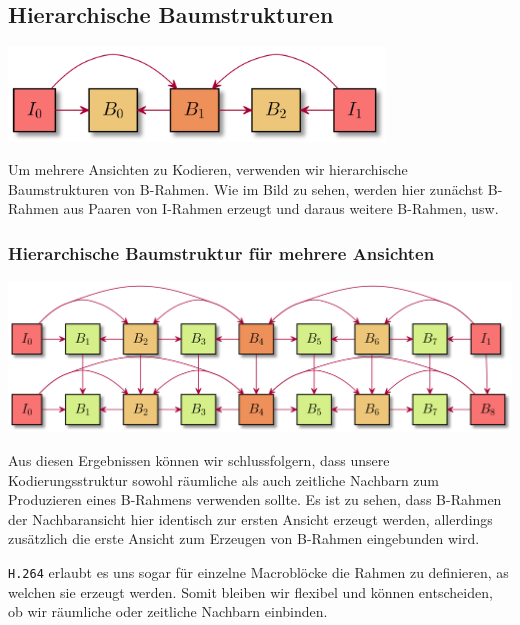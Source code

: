 \subsection{Hierarchische Baumstrukturen}\label{subsec:htrees}

\begin{center}
    \includegraphics[width=0.75\textwidth]{../img/b-pictures}
\end{center}

Um mehrere Ansichten zu Kodieren, verwenden wir hierarchische Baumstrukturen von B-Rahmen.
Wie im Bild zu sehen, werden hier zun\"achst B-Rahmen aus Paaren von I-Rahmen erzeugt und daraus weitere B-Rahmen, usw.


\subsubsection{Hierarchische Baumstruktur f\"ur mehrere Ansichten}
\begin{center}
    \includegraphics[width=1\textwidth]{../img/b-pictures-3d}
\end{center}
Aus diesen Ergebnissen k\"onnen wir schlussfolgern, dass unsere Kodierungsstruktur sowohl r\"aumliche als auch zeitliche
Nachbarn zum Produzieren eines B-Rahmens verwenden sollte.
Es ist zu sehen, dass B-Rahmen der Nachbaransicht hier identisch zur ersten Ansicht erzeugt werden, allerdings
zus\"atzlich die erste Ansicht zum Erzeugen von B-Rahmen eingebunden wird.

\noindent\newline \texttt{H.264} erlaubt es uns sogar f\"ur einzelne Macrobl\"ocke die Rahmen zu definieren, as welchen sie
erzeugt werden.
Somit bleiben wir flexibel und k\"onnen entscheiden, ob wir r\"aumliche oder zeitliche Nachbarn einbinden.
